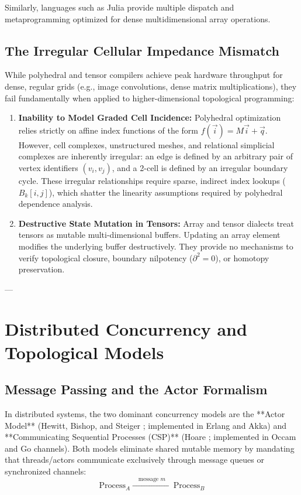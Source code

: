 Similarly, languages such as Julia \cite{bezanson2017julia} provide multiple dispatch and metaprogramming optimized for dense multidimensional array operations.

\subsection{The Irregular Cellular Impedance Mismatch}
While polyhedral and tensor compilers achieve peak hardware throughput for dense, regular grids (e.g., image convolutions, dense matrix multiplications), they fail fundamentally when applied to higher-dimensional topological programming:

\begin{enumerate}[leftmargin=1.2cm]
    \item \textbf{Inability to Model Graded Cell Incidence:}  
    Polyhedral optimization relies strictly on affine index functions of the form $f(\vec{i}) = M \vec{i} + \vec{q}$. However, cell complexes, unstructured meshes, and relational simplicial complexes are inherently irregular: an edge is defined by an arbitrary pair of vertex identifiers $(v_i, v_j)$, and a 2-cell is defined by an irregular boundary cycle. These irregular relationships require sparse, indirect index lookups ($B_k[i, j]$), which shatter the linearity assumptions required by polyhedral dependence analysis.

    \item \textbf{Destructive State Mutation in Tensors:}  
    Array and tensor dialects treat tensors as mutable multi-dimensional buffers. Updating an array element modifies the underlying buffer destructively. They provide no mechanisms to verify topological closure, boundary nilpotency ($\partial^2 = 0$), or homotopy preservation.
\end{enumerate}

---

\section{Distributed Concurrency and Topological Models}
\label{sec:distributed_concurrency}

\subsection{Message Passing and the Actor Formalism}
In distributed systems, the two dominant concurrency models are the **Actor Model** (Hewitt, Bishop, and Steiger \cite{hewitt1973universal}; implemented in Erlang and Akka) and **Communicating Sequential Processes (CSP)** (Hoare \cite{hoare1978communicating}; implemented in Occam and Go channels). Both models eliminate shared mutable memory by mandating that threads/actors communicate exclusively through message queues or synchronized channels:
\begin{equation}
    \text{Process}_A \xrightarrow{\quad \text{message } m \quad} \text{Process}_B
\end{equation}

